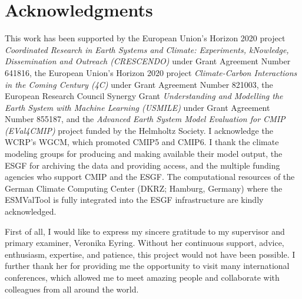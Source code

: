 
%



\chapter{Acknowledgments}

This work has been supported by the European Union's Horizon 2020 project
\emph{Coordinated Research in Earth Systems and Climate: Experiments,
  kNowledge, Dissemination and Outreach (CRESCENDO)} under Grant Agreement
Number 641816, the European Union's Horizon 2020 project \emph{Climate-Carbon
  Interactions in the Coming Century (4C)} under Grant Agreement Number 821003,
the European Research Council Synergy Grant \emph{Understanding and Modelling
  the Earth System with Machine Learning (USMILE)} under Grant Agreement Number
855187, and the \emph{Advanced Earth System Model Evaluation for CMIP
  (EVal4CMIP)} project funded by the Helmholtz Society. I acknowledge the
\ac{WCRP}'s \ac{WGCM}, which promoted \acs{CMIP}5 and \acs{CMIP}6. I thank the
climate modeling groups for producing and making available their model output,
the \ac{ESGF} for archiving the data and providing access, and the multiple
funding agencies who support \ac{CMIP} and the \ac{ESGF}. The computational
resources of the German Climate Computing Center (DKRZ; Hamburg, Germany) where
the \ac{ESMValTool} is fully integrated into the \ac{ESGF} infrastructure are
kindly acknowledged.

First of all, I would like to express my sincere gratitude to my supervisor and
primary examiner, \Prof{} \Dr{} Veronika Eyring. Without her continuous
support, advice, enthusiasm, expertise, and patience, this \PhD{} project would
not have been possible. I further thank her for providing me the opportunity to
visit many international conferences, which allowed me to meet amazing people
and collaborate with colleagues from all around the world.

